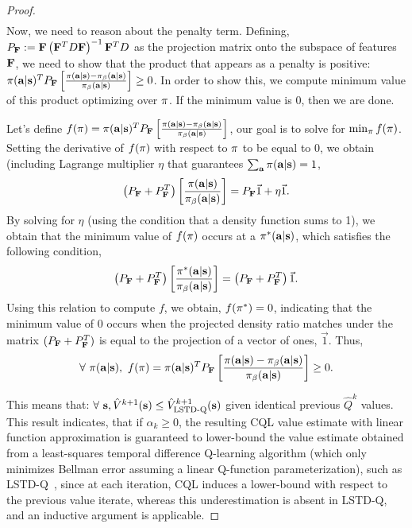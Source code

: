 \begin{proof}
\begin{align}
    \label{expr:lstdq_value}
\end{align}
Now, we need to reason about the penalty term. Defining, $P_{\mathbf{F}} := \mathbf{F} \left(\mathbf{F}^T D \mathbf{F} \right)^{-1} \mathbf{F}^T D$ as the projection matrix onto the subspace of features $\mathbf{F}$, we need to show that the product that appears as a penalty is positive: $\pi(\mathbf{a}|\mathbf{s})^T P_{\mathbf{F}} \left[\frac{\pi(\mathbf{a}|\mathbf{s}) - {\pi_\beta}(\mathbf{a}|\mathbf{s})}{{\pi_\beta}(\mathbf{a}|\mathbf{s})} \right] \geq 0$. In order to show this, we compute minimum value of this product optimizing over $\pi$. If the minimum value is $0$, then we are done.

Let's define $f(\pi) = \pi(\mathbf{a}|\mathbf{s})^T P_{\mathbf{F}} \left[\frac{\pi(\mathbf{a}|\mathbf{s}) - {\pi_\beta}(\mathbf{a}|\mathbf{s})}{{\pi_\beta}(\mathbf{a}|\mathbf{s})} \right]$, our goal is to solve for $\min_{\pi} f(\pi)$. Setting the derivative of $f(\pi)$ with respect to $\pi$ to be equal to 0, we obtain (including Lagrange multiplier $\eta$ that guarantees $\sum_{\mathbf{a}} \pi(\mathbf{a}|\mathbf{s}) = 1$,
\begin{equation*}
    \left( P_{\mathbf{F}} + P_{\mathbf{F}}^T \right) \left[\frac{\pi(\mathbf{a}|\mathbf{s})}{{\pi_\beta}(\mathbf{a}|\mathbf{s})}\right] = P_{\mathbf{F}} \Vec{1} + \eta \Vec{1}.
\end{equation*}
By solving for $\eta$ (using the condition that a density function sums to 1), we obtain that the minimum value of $f(\pi)$ occurs at a $\pi^*(\mathbf{a}|\mathbf{s})$, which satisfies the following condition,
\begin{equation*}
    \left(P_{\mathbf{F}} + P_{\mathbf{F}}^T \right) \left[\frac{\pi^*(\mathbf{a}|\mathbf{s})}{{\pi_\beta}(\mathbf{a}|\mathbf{s})}\right] = \left( P_{\mathbf{F}} + P_{\mathbf{F}}^T \right) \Vec{1}.
\end{equation*}
Using this relation to compute $f$, we obtain, $f(\pi^*) = 0$, indicating that the minimum value of $0$ occurs when the projected density ratio matches under the matrix $(P_{\mathbf{F}} + P_{\mathbf{F}}^T)$ is equal to the projection of a vector of ones, $\Vec{1}$. Thus, \begin{equation*}
    \forall~ \pi(\mathbf{a}|\mathbf{s}),~ f(\pi) = \pi(\mathbf{a}|\mathbf{s})^T P_{\mathbf{F}} \left[\frac{\pi(\mathbf{a}|\mathbf{s}) - {\pi_\beta}(\mathbf{a}|\mathbf{s})}{{\pi_\beta}(\mathbf{a}|\mathbf{s})} \right] \geq 0.
\end{equation*}

This means that: $\forall ~\mathbf{s}, \hat{V}^{k+1}(\mathbf{s}) \leq \hat{V}^{k+1}_{\text{LSTD-Q}}(\mathbf{s})$ given identical previous $\hat{Q}^{k}$ values. This result indicates, that if $\alpha_k \geq 0$, the resulting CQL value estimate with linear function approximation is guaranteed to lower-bound the value estimate obtained from a least-squares temporal difference Q-learning algorithm (which only minimizes Bellman error assuming a linear Q-function parameterization), such as LSTD-Q~\citep{lagoudakis2003least}, since at each iteration, CQL induces a lower-bound with respect to the previous value iterate, whereas this underestimation is absent in LSTD-Q, and an inductive argument is applicable.


\end{proof}
